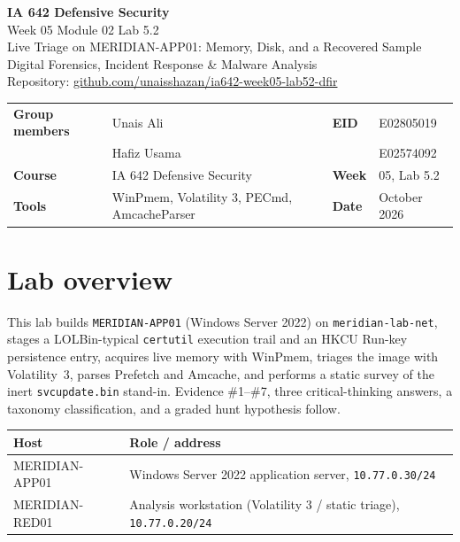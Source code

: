 \documentclass[11pt,letterpaper]{article}
\begin{document}
\begin{center}
{\LARGE\bfseries IA 642 Defensive Security}\\[0.25em]
{\Large Week 05 Module 02 Lab 5.2}\\[0.2em]
{\large Live Triage on MERIDIAN-APP01: Memory, Disk, and a Recovered Sample}\\[0.35em]
{\small Digital Forensics, Incident Response \& Malware Analysis}\\[0.25em]
{\small Repository:
\href{https://github.com/unaisshazan/ia642-week05-lab52-dfir}{github.com/unaisshazan/ia642-week05-lab52-dfir}}\\[0.25em]
\end{center}

\begin{tabularx}{\textwidth}{@{}l X l l@{}}
\toprule
\textbf{Group members} & Unais Ali & \textbf{EID} & E02805019 \\
 & Hafiz Usama &  & E02574092 \\
\textbf{Course} & IA 642 Defensive Security & \textbf{Week} & 05, Lab 5.2 \\
\textbf{Tools} & WinPmem, Volatility 3, PECmd, AmcacheParser & \textbf{Date} & October 2026 \\
\bottomrule
\end{tabularx}

\vspace{0.55em}

\section*{Lab overview}

This lab builds \texttt{MERIDIAN-APP01} (Windows Server 2022) on \texttt{meridian-lab-net}, stages a LOLBin-typical \texttt{certutil} execution trail and an HKCU Run-key persistence entry, acquires live memory with WinPmem, triages the image with Volatility~3, parses Prefetch and Amcache, and performs a static survey of the inert \texttt{svcupdate.bin} stand-in. Evidence \#1--\#7, three critical-thinking answers, a taxonomy classification, and a graded hunt hypothesis follow.

\begin{tabularx}{\textwidth}{@{}l Y@{}}
\toprule
\textbf{Host} & \textbf{Role / address} \\
\midrule
MERIDIAN-APP01 & Windows Server 2022 application server, \texttt{10.77.0.30/24} \\
MERIDIAN-RED01 & Analysis workstation (Volatility 3 / static triage), \texttt{10.77.0.20/24} \\
\bottomrule
\end{tabularx}
\end{document}
